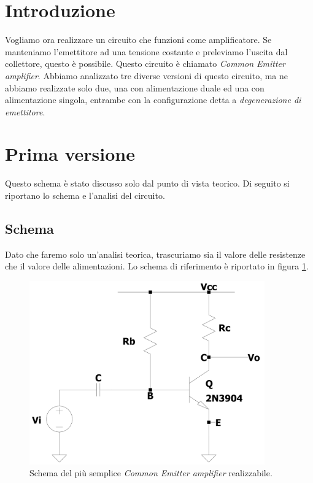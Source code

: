 \documentclass{report}
\begin{document}
\section{Introduzione}
Vogliamo ora realizzare un circuito che funzioni come amplificatore. Se manteniamo l'emettitore ad una tensione costante e preleviamo l'uscita dal collettore, questo è possibile. Questo circuito è chiamato \textit{Common Emitter amplifier}. Abbiamo analizzato tre diverse versioni di questo circuito, ma ne abbiamo realizzate solo due, una con alimentazione duale ed una con alimentazione singola, entrambe con la configurazione detta a \textit{degenerazione di emettitore}. 
\section{Prima versione} %
\label{CEv1_cap}
Questo schema è stato discusso solo dal punto di vista teorico. Di seguito si riportano lo schema e l'analisi del circuito. 
\subsection{Schema} 
Dato che faremo solo un'analisi teorica, trascuriamo sia il valore delle resistenze che il valore delle alimentazioni. Lo schema di riferimento è riportato in figura \ref{figura:CEv1}.
\begin{figure}[h]
\centering
\includegraphics[height=7.9cm]{immagini/CEv1}
\caption{Schema del più semplice \textit{Common Emitter amplifier} realizzabile.}
\label{figura:CEv1}
\end{figure}
\end{document}
